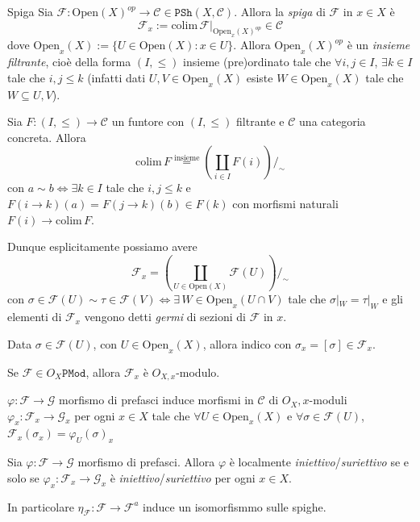 \begin{definition}{Spiga}
    Sia \(\mathcal{F}:\mathrm{Open}{(X)}^{op} \to \mathcal{C} \in \mathtt{PSh}{(X, \mathcal{C})}\). Allora la
    \emph{spiga} di \(\mathcal{F}\) in \(x \in X\) è 
    \[
      \mathcal{F}_x := \mathrm{colim} \,\mathcal{F}|_{\mathrm{Open}_x{(X)}^{op}} \in
      \mathcal{C}
    \]
    dove \(\mathrm{Open}_x{(X)} := \{U \in \mathrm{Open}{(X)} : x \in U\} \).
    Allora \(\mathrm{Open}_x{(X)}^{op}\) è un \emph{insieme filtrante}, cioè
    della forma \({(I, \le )}\) insieme (pre)ordinato tale che \(\forall i, j
    \in I\), \(\exists k \in I\) tale che \(i , j \le k\) (infatti dati \(U, V
    \in \mathrm{Open}_x{(X)}\) esiste \(W \in \mathrm{Open}_x{(X)}\) tale che
    \(W \subseteq U, V \)).
\end{definition}

Sia \(F : {(I, \le )}\to \mathcal{C}\) un funtore con \({(I, \le )}\) filtrante
e \(\mathcal{C}\) una categoria concreta. Allora
\[
  \mathrm{colim}\, F \overset{\text{insieme}}{=} {\left( \coprod_{i \in I} F{(i)}
  \right)} /_\sim 
\]
con \(a \sim b \iff \exists k \in I\) tale che \(i, j \le k\) e \(F{(i\to
k)}{(a)} = F{(j \to k)}{(b)} \in F{(k)}\) con morfismi naturali \(F{(i)} \to
\mathrm{colim}\, F\).

Dunque esplicitamente possiamo avere
\[
  \mathcal{F}_x = {\left( \coprod_{U \in \mathrm{Open}{(X)}} \mathcal{F}{(U)}
  \right)}/_\sim 
\]
con \(\sigma \in \mathcal{F}{(U)} \sim \tau \in \mathcal{F}{(V)}\iff \exists \,W
\in \mathrm{Open}_x{(U \cap V)}\) tale
che \(\sigma|_W = \tau|_W\) e gli elementi di \(\mathcal{F}_x\) vengono detti
\emph{germi} di sezioni di \(\mathcal{F}\) in \(x\).

\begin{note}[zione]
    Data \(\sigma \in \mathcal{F}{(U)}\), con \(U \in \mathrm{Open}_x {(X)}\),
    allora indico con \(\sigma_x = [\sigma] \in  \mathcal{F}_x\).
\end{note}

Se \(\mathcal{F} \in O_X\mathtt{PMod}\), allora \(\mathcal{F}_x\) è
\(O_{X,x}\)-modulo.

\(\varphi : \mathcal{F} \to \mathcal{G}\) morfismo di prefasci induce morfismi
in \(\mathcal{C}\) di \(O_X,x\)-moduli \(\varphi_x : \mathcal{F}_x \to
\mathcal{G}_x\) per ogni \(x \in X\) tale che \(\forall U \in
\mathrm{Open}_x{(X)}\) e \(\forall \sigma \in \mathcal{F}{(U)}\),
\(\mathcal{F}_x{(\sigma_x)} = \varphi _U{(\sigma)}_x\) 

\begin{lemma}{}\label{lem:inj}
    Sia \(\varphi : \mathcal{F} \to \mathcal{G}\) morfismo di prefasci. Allora
    \(\varphi \) è localmente \emph{iniettivo}/\emph{suriettivo} se e solo se
    \(\varphi_x : \mathcal{F}_x \to \mathcal{G}_x\) è
    \emph{iniettivo}/\emph{suriettivo} per ogni \(x \in X\).

    In particolare \(\eta_\mathcal{F} : \mathcal{F} \to \mathcal{F}^{a}\) induce
    un isomorfismmo sulle spighe.
\end{lemma}

